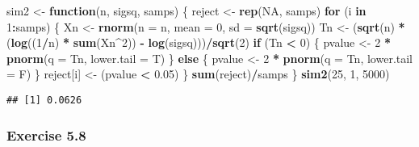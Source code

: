 \documentclass[12pt,]{article}
\newenvironment{Shaded}{\begin{snugshade}}{\end{snugshade}}
\newcommand{\ControlFlowTok}[1]{\textcolor[rgb]{0.13,0.29,0.53}{\textbf{#1}}}
\newcommand{\DataTypeTok}[1]{\textcolor[rgb]{0.13,0.29,0.53}{#1}}
\newcommand{\DecValTok}[1]{\textcolor[rgb]{0.00,0.00,0.81}{#1}}
\newcommand{\FloatTok}[1]{\textcolor[rgb]{0.00,0.00,0.81}{#1}}
\newcommand{\KeywordTok}[1]{\textcolor[rgb]{0.13,0.29,0.53}{\textbf{#1}}}
\newcommand{\NormalTok}[1]{#1}
\newcommand{\OperatorTok}[1]{\textcolor[rgb]{0.81,0.36,0.00}{\textbf{#1}}}
\newcommand{\OtherTok}[1]{\textcolor[rgb]{0.56,0.35,0.01}{#1}}
\newcommand{\StringTok}[1]{\textcolor[rgb]{0.31,0.60,0.02}{#1}}
\begin{document}
\begin{Shaded}
\begin{Highlighting}[]
\NormalTok{sim2 <-}\StringTok{ }\ControlFlowTok{function}\NormalTok{(n, sigsq, samps) \{}
\NormalTok{    reject <-}\StringTok{ }\KeywordTok{rep}\NormalTok{(}\OtherTok{NA}\NormalTok{, samps)}
    \ControlFlowTok{for}\NormalTok{ (i }\ControlFlowTok{in} \DecValTok{1}\OperatorTok{:}\NormalTok{samps) \{}
\NormalTok{        Xn <-}\StringTok{ }\KeywordTok{rnorm}\NormalTok{(}\DataTypeTok{n =}\NormalTok{ n, }\DataTypeTok{mean =} \DecValTok{0}\NormalTok{, }\DataTypeTok{sd =} \KeywordTok{sqrt}\NormalTok{(sigsq))}
\NormalTok{        Tn <-}\StringTok{ }\NormalTok{(}\KeywordTok{sqrt}\NormalTok{(n) }\OperatorTok{*}\StringTok{ }\NormalTok{(}\KeywordTok{log}\NormalTok{((}\DecValTok{1}\OperatorTok{/}\NormalTok{n) }\OperatorTok{*}\StringTok{ }\KeywordTok{sum}\NormalTok{(Xn}\OperatorTok{^}\DecValTok{2}\NormalTok{)) }\OperatorTok{-}\StringTok{ }
\StringTok{            }\KeywordTok{log}\NormalTok{(sigsq)))}\OperatorTok{/}\KeywordTok{sqrt}\NormalTok{(}\DecValTok{2}\NormalTok{)}
        \ControlFlowTok{if}\NormalTok{ (Tn }\OperatorTok{<}\StringTok{ }\DecValTok{0}\NormalTok{) \{}
\NormalTok{            pvalue <-}\StringTok{ }\DecValTok{2} \OperatorTok{*}\StringTok{ }\KeywordTok{pnorm}\NormalTok{(}\DataTypeTok{q =}\NormalTok{ Tn, }\DataTypeTok{lower.tail =}\NormalTok{ T)}
\NormalTok{        \} }\ControlFlowTok{else}\NormalTok{ \{}
\NormalTok{            pvalue <-}\StringTok{ }\DecValTok{2} \OperatorTok{*}\StringTok{ }\KeywordTok{pnorm}\NormalTok{(}\DataTypeTok{q =}\NormalTok{ Tn, }\DataTypeTok{lower.tail =}\NormalTok{ F)}
\NormalTok{        \}}
\NormalTok{        reject[i] <-}\StringTok{ }\NormalTok{(pvalue }\OperatorTok{<}\StringTok{ }\FloatTok{0.05}\NormalTok{)}
\NormalTok{    \}}
    \KeywordTok{sum}\NormalTok{(reject)}\OperatorTok{/}\NormalTok{samps}
\NormalTok{\}}
\KeywordTok{sim2}\NormalTok{(}\DecValTok{25}\NormalTok{, }\DecValTok{1}\NormalTok{, }\DecValTok{5000}\NormalTok{)}
\end{Highlighting}
\end{Shaded}

\begin{verbatim}
## [1] 0.0626
\end{verbatim}

\hypertarget{exercise-5.8}{%
\subsubsection{Exercise 5.8}\label{exercise-5.8}}
\end{document}
